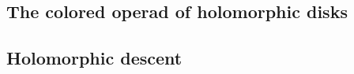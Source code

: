 \documentclass[10pt]{amsart}
\def\brian{\textcolor{blue}{BW: }\textcolor{blue}}
\begin{document}
%
%

\subsection{The colored operad of holomorphic disks}

%

\subsection{Holomorphic descent}
\end{document}
